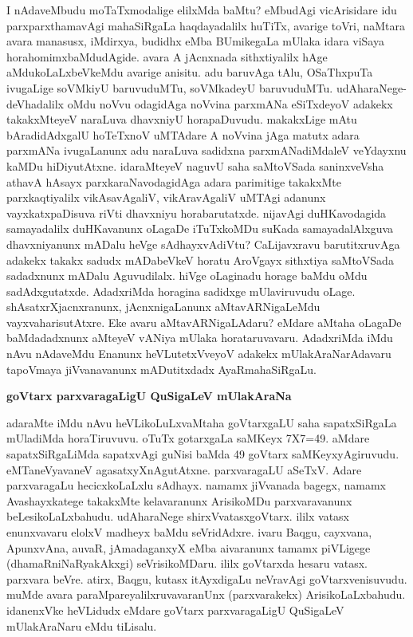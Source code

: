 I nAdaveMbudu moTaTxmodalige elilxMda baMtu? eMbudAgi vicArisidare idu parxparxthama\-vAgi mahaSiRgaLa haqdayadalilx huTiTx, avarige toVri, naMtara avara manasusx, iMdirxya, budidhx eMba BUmike\-gaLa mUlaka idara viSaya horahomimxbaMdudAgide. avara A jAcnxnada sithxtiyalilx hAge aMdu\-koLaLxbeVkeMdu avarige anisitu. adu baruvAga tAlu, OSaThxpuTa ivugaLige soVMkiyU baruvu\-duMTu, soVMkadeyU baruvuduMTu. udAharaNege- deVhadalilx oMdu noVvu odagidAga noVvina parxmANa eSiTxdeyoV adakekx takakxMteyeV naraLuva dhavxniyU horapaDuvudu. makakxLige mAtu bAradi\-dAdxgalU hoTeTxnoV uMTAdare A noVvina jAga matutx adara parxmANa ivugaLanunx adu naraLuva sadidxna parxmANadiMdaleV veYdayxnu kaMDu hiDiyutAtxne. idaraMteyeV naguvU saha saMtoVSada saninxveVsha athavA hAsayx parxkaraNavodagidAga adara parimitige takakxMte parxkaqtiyalilx vikAsavAgaliV, vikAravAgaliV uMTAgi adanunx vayxkatxpaDisuva riVti dhavxniyu horabarutatxde. nijavAgi duHKavodagida samayadalilx duHKavanunx oLagaDe iTuTxkoMDu suKada samayadalAlxguva dhavxniyanunx mADalu heVge sAdhayxvAdiVtu? CaLijavxravu barutitxruvAga adakekx takakx sadudx mADabeVkeV horatu AroVgayx sithxtiya saMtoVSada sadadxnunx mADalu Aguvudilalx. hiVge oLaginadu horage baMdu oMdu sadAdxgutatxde. AdadxriMda horagina sadidxge mUlaviruvudu oLage. shAsatxrXjacnxranunx, jAcnxnigaLanunx aMtavARNigaLeMdu vayxvaharisutAtxre. Eke avaru aMtavARNigaLAdaru? eMdare aMtaha oLagaDe baMdadadxnunx aMteyeV vANiya mUlaka horataru\-vavaru. AdadxriMda iMdu nAvu nAdaveMdu Enanunx heVLutetxVveyoV adakekx mUlakAraNarAdavaru tapoVmaya jiVvanavanunx mADutitxdadx AyaRmahaSiRgaLu.

{\bigskip
\noindent
{\large\bf goVtarx parxvaragaLigU QuSigaLeV mUlakAraNa}}\label{page139}
\medskip

\noindent
adaraMte iMdu nAvu heVLikoLuLxvaMtaha goVtarxgaLU saha sapatxSiRgaLa mUladiMda horaTiru\-vuvu. oTuTx gotarxgaLa saMKeyx {\rm 7X7=49.} aMdare sapatxSiRgaLiMda sapatxvAgi guNisi baMda {\rm 49} goVtarx saMKeyxyAgiruvudu. eMTaneVyavaneV agasatxyXnAgutAtxne. parxvaragaLU aSeTxV. Adare parxvaragaLu hecicx\-koLaLxlu sAdhayx. namamx jiVvanada bagegx, namamx Avashayxkatege takakxMte kelavaranunx ArisikoMDu parxvaravanunx beLesikoLaLxbahudu. udAharaNege shirxVvatasxgoVtarx. ililx vatasx enunxvavaru elolxV madheyx baMdu seVri\-dAdxre. ivaru Baqgu, cayxvana, ApunxvAna, auvaR, jAmadaganxyX eMba aivaranunx tamamx piVLigege (dhamaRniNaRya\-kAkxgi) seVrisikoMDaru. ililx goVtarxda hesaru vatasx. parxvara beVre. atirx, Baqgu, kutasx itAyxdigaLu neVravAgi goVtarxvenisuvudu. muMde avara paraMpareyalilxruvavaranUnx (parxvarakekx) ArisikoLaLxbahudu. idanenxVke heVLidudx eMdare goVtarx parxvaragaLigU QuSigaLeV mUlakAraNaru eMdu tiLisalu.

